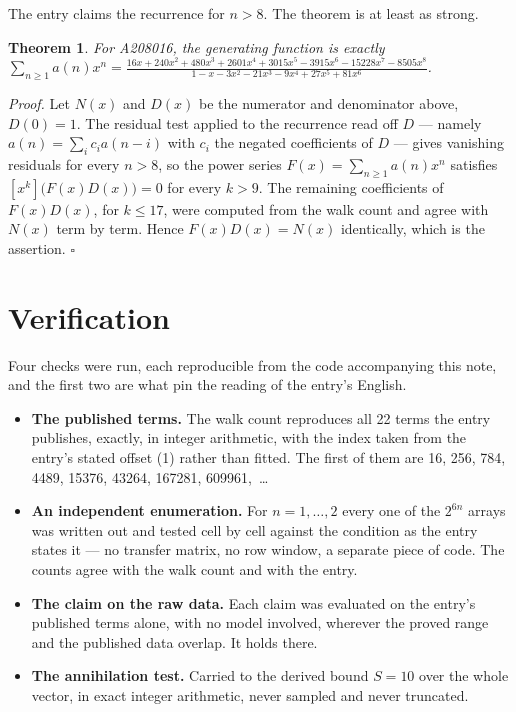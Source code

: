 \documentclass[11pt]{article}
\newtheorem{theorem}{Theorem}
\theoremstyle{definition}
\begin{document}
The entry claims the recurrence for $n > 8$. The theorem is at least as strong.

\begin{theorem} For A208016, the generating function is exactly $\sum_{n\ge 1} a(n)x^n = \frac{16x + 240x^{2} + 480x^{3} + 2601x^{4} + 3015x^{5} - 3915x^{6} - 15228x^{7} - 8505x^{8}}{1 - x - 3x^{2} - 21x^{3} - 9x^{4} + 27x^{5} + 81x^{6}}$.\end{theorem}

{\itshape Proof.} Let $N(x)$ and $D(x)$ be the numerator and denominator above, $D(0)=1$. The residual test applied to the recurrence read off $D$ --- namely $a(n) = \sum_i c_i a(n-i)$ with $c_i$ the negated coefficients of $D$ --- gives vanishing residuals for every $n > 8$, so the power series $F(x)=\sum_{n\ge 1}a(n)x^n$ satisfies $[x^k]\bigl(F(x)D(x)\bigr) = 0$ for every $k > 9$. The remaining coefficients of $F(x)D(x)$, for $k \le 17$, were computed from the walk count and agree with $N(x)$ term by term. Hence $F(x)D(x) = N(x)$ identically, which is the assertion. $\square$

\section{Verification}

Four checks were run, each reproducible from the code accompanying this note, and the first two are what pin the reading of the entry's English.

\begin{itemize}

\item {\bfseries The published terms.} The walk count reproduces all 22 terms the entry publishes, exactly, in integer arithmetic, with the index taken from the entry's stated offset (1) rather than fitted. The first of them are 16, 256, 784, 4489, 15376, 43264, 167281, 609961,~\dots

\item {\bfseries An independent enumeration.} For $n = 1,\dots,2$ every one of the $2^{6n}$ arrays was written out and tested cell by cell against the condition as the entry states it --- no transfer matrix, no row window, a separate piece of code. The counts agree with the walk count and with the entry.

\item {\bfseries The claim on the raw data.} Each claim was evaluated on the entry's published terms alone, with no model involved, wherever the proved range and the published data overlap. It holds there.

\item {\bfseries The annihilation test.} Carried to the derived bound $S = 10$ over the whole vector, in exact integer arithmetic, never sampled and never truncated.

\end{itemize}
\end{document}
